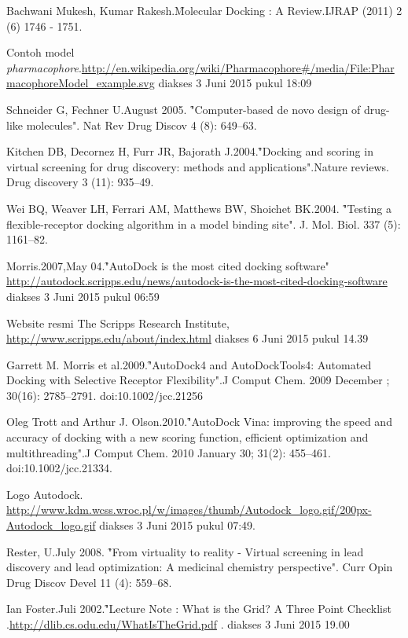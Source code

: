 \begin{thebibliography}{4}
{Bachwani Mukesh, Kumar Rakesh.\f{Molecular Docking : A Review}.IJRAP (2011) 2 (6) 1746 - 1751.}

{Contoh model \textit{pharmacophore}.\url{http://en.wikipedia.org/wiki/Pharmacophore#/media/File:PharmacophoreModel_example.svg} diakses 3 Juni 2015 pukul 18:09}

{Schneider G, Fechner U.August 2005. \f{"Computer-based de novo design of drug-like molecules".} Nat Rev Drug Discov 4 (8): 649–63.}

{Kitchen DB, Decornez H, Furr JR, Bajorath J.2004.\f{"Docking and scoring in virtual screening for drug discovery: methods and applications"}.Nature reviews. Drug discovery 3 (11): 935–49.}

{Wei BQ, Weaver LH, Ferrari AM, Matthews BW, Shoichet BK.2004. \f{"Testing a flexible-receptor docking algorithm in a model binding site"}. J. Mol. Biol. 337 (5): 1161–82.}

{Morris.2007,May 04.\f{"AutoDock is the most cited docking software"} \url{http://autodock.scripps.edu/news/autodock-is-the-most-cited-docking-software} diakses 3 Juni 2015 pukul 06:59}

{Website resmi The Scripps Research Institute,
	\url{http://www.scripps.edu/about/index.html} diakses 6 Juni 2015 pukul 14.39}

{Garrett M. Morris et al.2009.\f{"AutoDock4 and AutoDockTools4: Automated Docking with Selective Receptor Flexibility"}.J Comput Chem. 2009 December ; 30(16): 2785–2791. doi:10.1002/jcc.21256}

{Oleg Trott and Arthur J. Olson.2010.\f{"AutoDock Vina: improving the speed and accuracy of docking	with a new scoring function, efficient optimization and multithreading"}.J Comput Chem. 2010 January 30; 31(2): 455–461. doi:10.1002/jcc.21334.}

{Logo Autodock. \url{http://www.kdm.wcss.wroc.pl/w/images/thumb/Autodock_logo.gif/200px-Autodock_logo.gif} diakses 3 Juni 2015 pukul 07:49.}

{Rester, U.July 2008. \f{"From virtuality to reality - Virtual screening in lead discovery and lead optimization: A medicinal chemistry perspective"}. Curr Opin Drug Discov Devel 11 (4): 559–68.}

{Ian Foster.Juli 2002.\f{"Lecture Note : What is the Grid? A Three Point Checklist }.\url{http://dlib.cs.odu.edu/WhatIsTheGrid.pdf} . diakses 3 Juni 2015 19.00}


\end{thebibliography}

